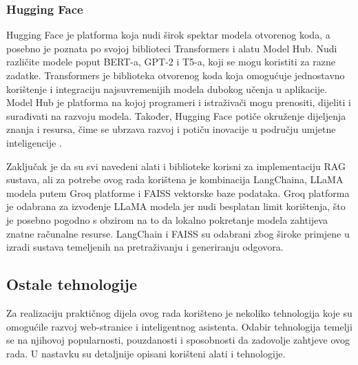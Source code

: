 \documentclass[]{foi}
\begin{document}
\subsubsection{Hugging Face}
Hugging Face je platforma koja nudi širok spektar modela otvorenog koda, a posebno je poznata po svojoj biblioteci Transformers i alatu Model Hub. Nudi različite modele poput BERT-a, 
GPT-2 i T5-a, koji se mogu koristiti za razne zadatke. Transformers je biblioteka otvorenog koda koja omogućuje jednostavno korištenje i integraciju najsuvremenijih modela dubokog učenja 
u aplikacije. Model Hub je platforma na kojoj programeri i istraživači mogu prenositi, dijeliti i surađivati na razvoju modela. Također, Hugging Face potiče okruženje dijeljenja znanja i 
resursa, čime se ubrzava razvoj i potiču inovacije u području umjetne inteligencije \cite{ozkaya2025llm}.

Zaključak je da su svi navedeni alati i biblioteke korisni za implementaciju RAG sustava, ali za potrebe ovog rada korištena je kombinacija LangChaina, LLaMA modela putem Groq platforme i 
FAISS vektorske baze podataka. Groq platforma je odabrana za izvođenje LLaMA modela jer nudi besplatan limit korištenja, što je posebno pogodno s obzirom na to da lokalno pokretanje modela 
zahtijeva znatne računalne resurse. LangChain i FAISS su odabrani zbog široke primjene u izradi sustava temeljenih na pretraživanju i generiranju odgovora.

\subsection{Ostale tehnologije}
Za realizaciju praktičnog dijela ovog rada korišteno je nekoliko tehnologija koje su omogućile razvoj web-stranice i inteligentnog asistenta. 
Odabir tehnologija temelji se na njihovoj popularnosti, pouzdanosti i sposobnosti da zadovolje zahtjeve ovog rada. U nastavku su detaljnije
opisani korišteni alati i tehnologije.
\end{document}
